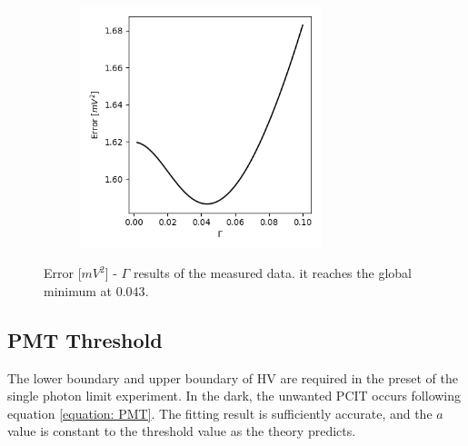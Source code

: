 \documentclass{article}
\begin{document}
\begin{figure}[H]
  \centering
  \begin{subfigure}[b]{7cm}
      \centering
      \includegraphics[width=7cm]{../results/laser_wavelength_dispersion.png}
      \caption{}
  \end{subfigure}
  \hfill
  \caption{Error [$mV^2$] - $\Gamma$ results of the measured data. it reaches the global minimum at $0.043$.}
  \label{fig: laser_dispersion}
\end{figure}

\subsection{PMT Threshold}
 The lower boundary and upper boundary of HV are required in the preset of the single photon limit experiment.
 In the dark, the unwanted PCIT occurs following equation \ref{equation: PMT}.
 The fitting result is sufficiently accurate, and the $a$ value is constant to the threshold value as the theory predicts.
\end{document}
